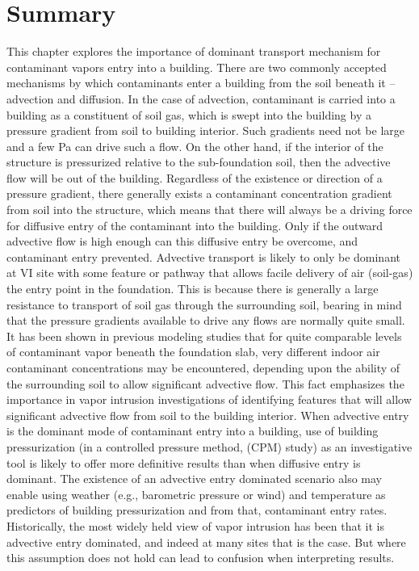 \section{Summary}

This chapter explores the importance of dominant transport mechanism for contaminant vapors entry into a building.
There are two commonly accepted mechanisms by which contaminants enter a building from the soil beneath it – advection and diffusion.
In the case of advection, contaminant is carried into a building as a constituent of soil gas, which is swept into the building by a pressure gradient from soil to building interior.
Such gradients need not be large and a few \si{\pascal} can drive such a flow.
On the other hand, if the interior of the structure is pressurized relative to the sub-foundation soil, then the advective flow will be out of the building.
Regardless of the existence or direction of a pressure gradient, there generally exists a contaminant concentration gradient from soil into the structure, which means that there will always be a driving force for diffusive entry of the contaminant into the building.
Only if the outward advective flow is high enough can this diffusive entry be overcome, and contaminant entry prevented.
Advective transport is likely to only be dominant at VI site with some feature or pathway that allows facile delivery of air (soil-gas) the entry point in the foundation.
This is because there is generally a large resistance to transport of soil gas through the surrounding soil, bearing in mind that the pressure gradients available to drive any flows are normally quite small.
It has been shown in previous modeling studies that for quite comparable levels of contaminant vapor beneath the foundation slab, very different indoor air contaminant concentrations may be encountered, depending upon the ability of the surrounding soil to allow significant advective flow\cite{bozkurt_simulation_2009,pennell_development_2009}.
This fact emphasizes the importance in vapor intrusion investigations of identifying features that will allow significant advective flow from soil to the building interior.
When advective entry is the dominant mode of contaminant entry into a building, use of building pressurization (in a controlled pressure method, (CPM) study) as an investigative tool is likely to offer more definitive results than when diffusive entry is dominant.
The existence of an advective entry dominated scenario also may enable using weather (e.g., barometric pressure or wind) and temperature as predictors of building pressurization and from that, contaminant entry rates.
Historically, the most widely held view of vapor intrusion has been that it is advective entry dominated, and indeed at many sites that is the case. But where this assumption does not hold can lead to confusion when interpreting results.
